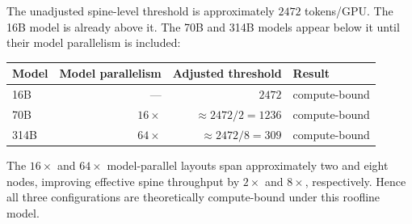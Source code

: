 \documentclass[11pt]{article}
\begin{document}
The unadjusted spine-level threshold is approximately
\(2472\) tokens/GPU.  The 16B model is already above it.  The 70B and 314B
models appear below it until their model parallelism is included:

\begin{center}
\begin{tabular}{@{}lrrl@{}}
\toprule
Model & Model parallelism & Adjusted threshold & Result \\
\midrule
16B  & --- & \(2472\) & compute-bound \\
70B  & \(16\times\) & \(\approx2472/2=1236\) & compute-bound \\
314B & \(64\times\) & \(\approx2472/8=309\) & compute-bound \\
\bottomrule
\end{tabular}
\end{center}

The \(16\times\) and \(64\times\) model-parallel layouts span approximately
two and eight nodes, improving effective spine throughput by \(2\times\)
and \(8\times\), respectively.  Hence all three configurations are
theoretically compute-bound under this roofline model.
\end{document}
